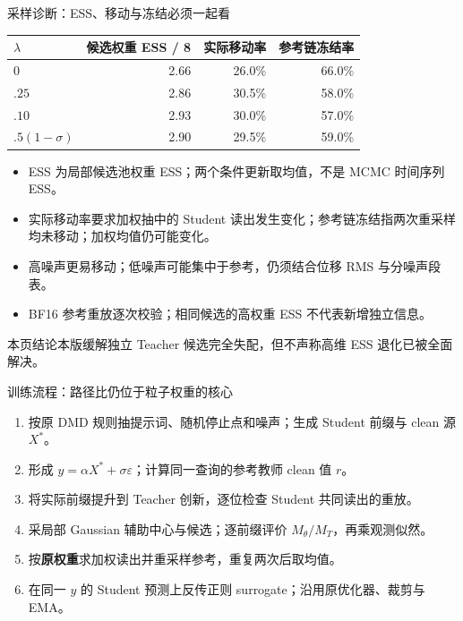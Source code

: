 \documentclass[10pt,aspectratio=169]{beamer}
\newcommand{\takeaway}[1]{\begin{exampleblock}{本页结论}\small #1\end{exampleblock}}
\begin{document}
\begin{frame}{采样诊断：ESS、移动与冻结必须一起看}
\small\centering
\begin{tabular}{lrrr}\toprule
$\lambda$ & 候选权重 ESS / 8 & 实际移动率 & 参考链冻结率\\\midrule
$0$ & 2.66 & 26.0\% & 66.0\% \\
$.25$ & 2.86 & 30.5\% & 58.0\% \\
$.10$ & 2.93 & 30.0\% & 57.0\% \\
$.5(1-\sigma)$ & 2.90 & 29.5\% & 59.0\% \\
\bottomrule\end{tabular}
\par\raggedright\vspace{5pt}
\begin{itemize}\itemsep5pt
\item ESS 为局部候选池权重 ESS；两个条件更新取均值，不是 MCMC 时间序列 ESS。
\item 实际移动率要求加权抽中的 Student 读出发生变化；参考链冻结指两次重采样均未移动；加权均值仍可能变化。
\item 高噪声更易移动；低噪声可能集中于参考，仍须结合位移 RMS 与分噪声段表。
\item BF16 参考重放逐次校验；相同候选的高权重 ESS 不代表新增独立信息。
\end{itemize}
\takeaway{本版缓解独立 Teacher 候选完全失配，但不声称高维 ESS 退化已被全面解决。}
\end{frame}

\begin{frame}{训练流程：路径比仍位于粒子权重的核心}
\small
\begin{enumerate}\itemsep5pt
\item 按原 DMD 规则抽提示词、随机停止点和噪声；生成 Student 前缀与 clean 源 $X^*$。
\item 形成 $y=\alpha X^*+\sigma\varepsilon$；计算同一查询的参考教师 clean 值 $r$。
\item 将实际前缀提升到 Teacher 创新，逐位检查 Student 共同读出的重放。
\item 采局部 Gaussian 辅助中心与候选；逐前缀评价 $M_\theta/M_T$，再乘观测似然。
\item 按\textbf{原权重}求加权读出并重采样参考，重复两次后取均值。
\item 在同一 $y$ 的 Student 预测上反传正则 surrogate；沿用原优化器、裁剪与 EMA。
\end{enumerate}
\end{frame}
\end{document}
